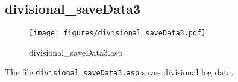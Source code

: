 \subsection{divisional\_saveData3}
\begin{figure}[htb]
    \begin{center}
        \texttt{[image: figures/divisional\_saveData3.pdf]}
    \end{center}
    \caption{divisional\_saveData3.asp}
    \label{fig:divisional_saveData3}
\end{figure}

The file \verb|divisional_saveData3.asp| saves divisional log data.
